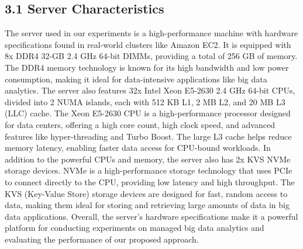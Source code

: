 \documentclass[twocolumn,10pt]{asme2e}
\begin{document}
\subsection*{3.1 Server Characteristics}
The server used in our experiments is a high-performance machine with hardware specifications found in real-world clusters like Amazon EC2. It is equipped with 8x DDR4 32-GB 2.4 GHz 64-bit DIMMs, providing a total of 256 GB of memory. The DDR4 memory technology is known for its high bandwidth and low power consumption, making it ideal for data-intensive applications like big data analytics. The server also features 32x Intel Xeon E5-2630 2.4 GHz 64-bit CPUs, divided into 2 NUMA islands, each with 512 KB L1, 2 MB L2, and 20 MB L3 (LLC) cache. The Xeon E5-2630 CPU is a high-performance processor designed for data centers, offering a high core count, high clock speed, and advanced features like hyper-threading and Turbo Boost. The large L3 cache helps reduce memory latency, enabling faster data access for CPU-bound workloads. In addition to the powerful CPUs and memory, the server also has 2x KVS NVMe storage devices. NVMe is a high-performance storage technology that uses PCIe to connect directly to the CPU, providing low latency and high throughput. The KVS (Key-Value Store) storage devices are designed for fast, random access to data, making them ideal for storing and retrieving large amounts of data in big data applications. Overall, the server's hardware specifications make it a powerful platform for conducting experiments on managed big data analytics and evaluating the performance of our proposed approach. 
\end{document}
